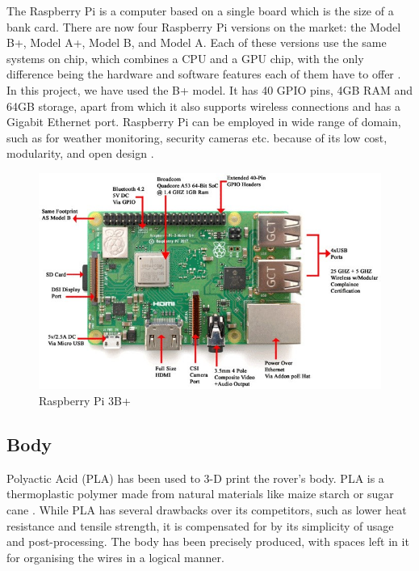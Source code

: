 \documentclass[conference,a4paper]{IEEEtran}
\begin{document}
The Raspberry Pi is a computer based on a single board which is the size of a bank card. There are now four Raspberry Pi versions on the market: the Model B+, Model A+, Model B, and Model A. Each of these versions use the same systems on chip, which combines a CPU and a GPU chip, with the only difference being the hardware and software features each of them have to offer \cite{4}.
In this project, we have used the B+ model. It has 40 GPIO pins, 4GB RAM and 64GB storage, apart from which it also supports wireless connections and has a Gigabit Ethernet port. Raspberry Pi can be employed in wide range of domain, such as for weather monitoring, security cameras etc. because of its low cost, modularity, and open design \cite{12}.
\begin{figure}[ht]
\centering
\includegraphics[width=1\linewidth]{RasPi.jpg}
\caption{Raspberry Pi 3B+ \cite{4}}
\label{Fig: Pi}
\end{figure}
\subsection{Body}
Polyactic Acid (PLA) has been used to 3-D print the rover's body. PLA is a thermoplastic polymer made from natural materials like maize starch or sugar cane \cite{20}. While PLA has several drawbacks over its competitors, such as lower heat resistance and tensile strength, it is compensated for by its simplicity of usage and post-processing. The body has been precisely produced, with spaces left in it for organising the wires in a logical manner.
\end{document}
